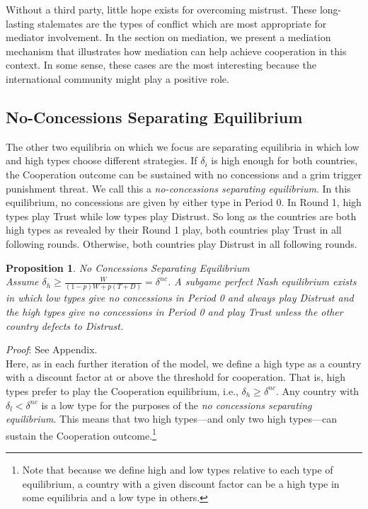 \documentclass[bibtex,autowc]{apsr_submission}
\newcommand{\de}{\delta}
\newtheorem{proposition}{Proposition}
\begin{document}
Without a third party, little hope exists for overcoming mistrust. These long-lasting stalemates are the types of conflict which are most appropriate for mediator involvement. In the section on mediation, we present a mediation mechanism that illustrates how mediation can help achieve cooperation in this context. In some sense, these cases are the most interesting because the international community might play a positive role. 

\subsection{No-Concessions Separating Equilibrium}
\label{sec:ncse}
The other two equilibria on which we focus are separating equilibria in which low and high types choose different strategies. If $\delta_i$ is high enough for both countries, the Cooperation outcome can be sustained with no concessions and a grim trigger punishment threat. We call this a \emph{no-concessions separating equilibrium}. In this equilibrium, no concessions are given by either type in Period 0. In Round 1, high types play Trust while low types play Distrust. So long as the countries are both high types as revealed by their Round 1 play, both countries play Trust in all following rounds. Otherwise, both countries play Distrust in all following rounds. 
\raggedbottom
\begin{proposition}
\emph{No Concessions Separating Equilibrium}\\
	Assume $\delta_h \geq \frac{W}{(1-p)W + p(T+D)}=\de^{nc}$. A subgame perfect Nash equilibrium exists in which low types give no concessions in Period 0 and always play Distrust and the high types give no concessions in Period 0 and play Trust unless the other country defects to Distrust.
	\label{proposition:1}
\end{proposition}
\vspace{-5pt}
\emph{Proof}: See Appendix.
\\
Here, as in each further iteration of the model, we define a high type as a country with a discount factor at or above the threshold for cooperation. That is, high types prefer to play the Cooperation equilibrium, i.e., $\delta_h \geq \delta^{nc}$. Any country with $\delta_l < \delta^{nc}$ is a low type for the purposes of the \emph{no concessions separating equilibrium}. This means that two high types---and only two high types---can sustain the Cooperation outcome.\footnote{Note that because we define high and low types relative to each type of equilibrium, a country with a given discount factor can be a high type in some equilibria and a low type in others.}
\end{document}
